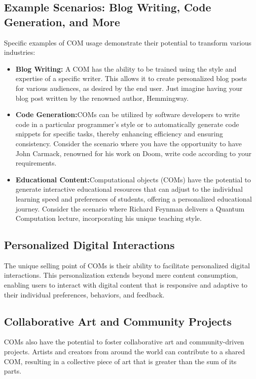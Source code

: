 \documentclass[12pt,a4paper]{article}
\begin{document}
\subsection{Example Scenarios: Blog Writing, Code Generation, and More}

Specific examples of COM usage demonstrate their potential to transform various industries:

\begin{itemize}
    \item \textbf{Blog Writing:} A COM has the ability to be trained using the style and expertise of a specific writer. This allows it to create personalized blog posts for various audiences, as desired by the end user. Just imagine having your blog post written by the renowned author, Hemmingway.
    \item \textbf{Code Generation:}COMs can be utilized by software developers to write code in a particular programmer's style or to automatically generate code snippets for specific tasks, thereby enhancing efficiency and ensuring consistency. Consider the scenario where you have the opportunity to have John Carmack, renowned for his work on Doom, write code according to your requirements.
    \item \textbf{Educational Content:}Computational objects (COMs) have the potential to generate interactive educational resources that can adjust to the individual learning speed and preferences of students, offering a personalized educational journey. Consider the scenario where Richard Feynman delivers a Quantum Computation lecture, incorporating his unique teaching style.
\end{itemize}

\subsection{Personalized Digital Interactions}

The unique selling point of COMs is their ability to facilitate personalized digital interactions. This personalization extends beyond mere content consumption, enabling users to interact with digital content that is responsive and adaptive to their individual preferences, behaviors, and feedback.

\subsection{Collaborative Art and Community Projects}

COMs also have the potential to foster collaborative art and community-driven projects. Artists and creators from around the world can contribute to a shared COM, resulting in a collective piece of art that is greater than the sum of its parts.
\end{document}
